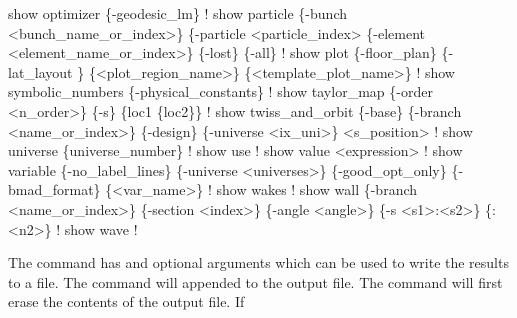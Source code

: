 {{{{\begin{example}
  show optimizer \{-geodesic_lm\}                                       ! 
  show particle \{-bunch <bunch_name_or_index>\} \{-particle <particle_index> 
        \{-element <element_name_or_index>\} \{-lost\} \{-all\}             ! 
  show plot \{-floor_plan\} \{-lat_layout \} \{<plot_region_name>\} 
        \{<template_plot_name>\}                                        ! 
  show symbolic_numbers \{-physical_constants\}                         ! 
  show taylor_map \{-order <n_order>\} \{-s\} \{loc1 \{loc2\}\}               ! 
  show twiss_and_orbit \{-base\} \{-branch <name_or_index>\} \{-design\} 
        \{-universe <ix_uni>\} <s_position>                             ! 
  show universe \{universe_number\}                                     ! 
  show use                                                            ! 
  show value <expression>                                             ! 
  show variable \{-no_label_lines\} \{-universe <universes>\}            
         \{-good_opt_only\} \{-bmad_format\} \{<var_name>\}                 ! 
  show wakes                                                          ! 
  show wall \{-branch <name_or_index>\} \{-section <index>\} \{-angle <angle>\} 
        \{-s <s1>:<s2>\} \{<n1>:<n2>\}                                    ! 
  show wave                                                           ! 
\end{example}

\vskip 10pt 

The  command has  and  optional arguments which can be
used to write the results to a file.  The  command will appended to the
output file. The  command will first erase the contents of the output
file. If \vn{global%
substituted for the \vn{*}. The value of the number starts at \vn{001} and increases by 1
each time \vn{show -write} is used.  Example:
\begin{example}
  show -write orb.dat orbit    ! Write orbit data to the file "orb.dat".
\end{example}

The \vn{-noprint} option suppresses printing and is useful when writing large amounts of
data to a file.

}}}}}
